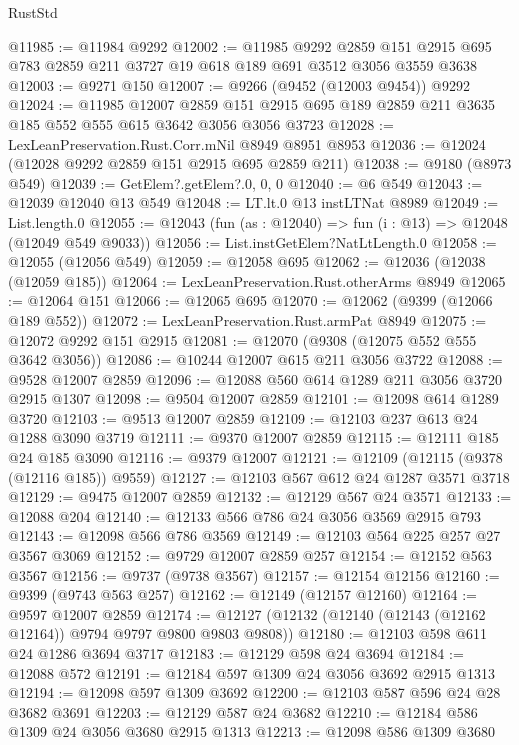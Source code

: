\begin{lexlean}{RustStd}
\begin{coremodule}
@11985 := @11984 @9292
@12002 := @11985
    @9292
    @2859
    @151
    @2915
    @695
    @783
    @2859
    @211
    @3727
    @19
    @618
    @189
    @691
    @3512
    @3056
    @3559
    @3638
@12003 := @9271 @150
@12007 := @9266 (@9452 (@12003 @9454)) @9292
@12024 := @11985
    @12007
    @2859
    @151
    @2915
    @695
    @189
    @2859
    @211
    @3635
    @185
    @552
    @555
    @615
    @3642
    @3056
    @3056
    @3723
@12028 := LexLeanPreservation.Rust.Corr.mNil @8949 @8951 @8953
@12036 := @12024 (@12028 @9292 @2859 @151 @2915 @695 @2859 @211)
@12038 := @9180 (@8973 @549)
@12039 := GetElem?.getElem?.{0, 0, 0}
@12040 := @6 @549
@12043 := @12039 @12040 @13 @549
@12048 := LT.lt.{0} @13 instLTNat @8989
@12049 := List.length.{0}
@12055 := @12043 (fun (as : @12040) => fun (i : @13) => @12048 (@12049 @549 @9033))
@12056 := List.instGetElem?NatLtLength.{0}
@12058 := @12055 (@12056 @549)
@12059 := @12058 @695
@12062 := @12036 (@12038 (@12059 @185))
@12064 := LexLeanPreservation.Rust.otherArms @8949
@12065 := @12064 @151
@12066 := @12065 @695
@12070 := @12062 (@9399 (@12066 @189 @552))
@12072 := LexLeanPreservation.Rust.armPat @8949
@12075 := @12072 @9292 @151 @2915
@12081 := @12070 (@9308 (@12075 @552 @555 @3642 @3056))
@12086 := @10244 @12007 @615 @211 @3056 @3722
@12088 := @9528 @12007 @2859
@12096 := @12088 @560 @614 @1289 @211 @3056 @3720 @2915 @1307
@12098 := @9504 @12007 @2859
@12101 := @12098 @614 @1289 @3720
@12103 := @9513 @12007 @2859
@12109 := @12103 @237 @613 @24 @1288 @3090 @3719
@12111 := @9370 @12007 @2859
@12115 := @12111 @185 @24 @185 @3090
@12116 := @9379 @12007
@12121 := @12109 (@12115 (@9378 (@12116 @185)) @9559)
@12127 := @12103 @567 @612 @24 @1287 @3571 @3718
@12129 := @9475 @12007 @2859
@12132 := @12129 @567 @24 @3571
@12133 := @12088 @204
@12140 := @12133 @566 @786 @24 @3056 @3569 @2915 @793
@12143 := @12098 @566 @786 @3569
@12149 := @12103 @564 @225 @257 @27 @3567 @3069
@12152 := @9729 @12007 @2859 @257
@12154 := @12152 @563 @3567
@12156 := @9737 (@9738 @3567)
@12157 := @12154 @12156
@12160 := @9399 (@9743 @563 @257)
@12162 := @12149 (@12157 @12160)
@12164 := @9597 @12007 @2859
@12174 := @12127 (@12132 (@12140 (@12143 (@12162 @12164)) @9794 @9797 @9800 @9803 @9808))
@12180 := @12103 @598 @611 @24 @1286 @3694 @3717
@12183 := @12129 @598 @24 @3694
@12184 := @12088 @572
@12191 := @12184 @597 @1309 @24 @3056 @3692 @2915 @1313
@12194 := @12098 @597 @1309 @3692
@12200 := @12103 @587 @596 @24 @28 @3682 @3691
@12203 := @12129 @587 @24 @3682
@12210 := @12184 @586 @1309 @24 @3056 @3680 @2915 @1313
@12213 := @12098 @586 @1309 @3680

\end{coremodule}
\end{lexlean}
